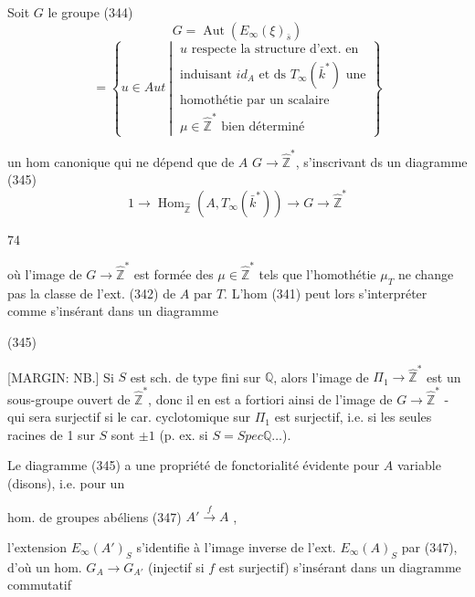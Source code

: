 Soit $G$ le groupe
(344) $$G = \operatorname{Aut}(E_{\infty}(\xi)_{\bar{s}})$$
$$= \left\{ u \in Aut \ \left| \ \begin{array}{l} u \text{ respecte la structure d'ext. en} \\ \text{induisant } id_A \text{ et ds } T_{\infty}(\bar{k}^*) \text{ une} \\ \text{homothétie par un scalaire} \\ \mu \in \hat{\mathbb{Z}}^* \text{ bien déterminé} \end{array} \right. \right\}$$

un hom canonique
qui ne dépend que de $A$
$G \to \hat{\mathbb{Z}}^*$, s'inscrivant ds un
diagramme
(345) $$1 \to \operatorname{Hom}_{\hat{\mathbb{Z}}}(A, T_{\infty}(\bar{k}^*)) \to G \to \hat{\mathbb{Z}}^*$$

\newpage


74

où l'image de $G \to \hat{\mathbb{Z}}^*$ est formée des $\mu \in \hat{\mathbb{Z}}^*$ tels que l'homothétie $\mu_T$ ne change pas la classe de l'ext. (342) de $A$ par $T$. L'hom (341) peut lors s'interpréter comme s'insérant dans un diagramme

(345)

[MARGIN: NB.] Si $S$ est sch. de type fini sur $\mathbb{Q}$, alors l'image de $\Pi_1 \to \hat{\mathbb{Z}}^*$ est un sous-groupe ouvert de $\hat{\mathbb{Z}}^*$, donc il en est a fortiori ainsi de l'image de $G \to \hat{\mathbb{Z}}^*$ - qui sera surjectif si le car. cyclotomique sur $\Pi_1$ est surjectif, i.e. si les seules racines de 1 sur $S$ sont $\pm 1$ (p. ex. si $S = Spec \mathbb{Q} \dots$).

Le diagramme (345) a
une propriété de fonctorialité évidente
pour $A$ variable (disons), i.e. pour un

\newpage


hom. de groupes abéliens
(347) $A' \xrightarrow{f} A$ ,

l'extension $E_{\infty}(A')_S$ s'identifie
à l'image inverse de l'ext. $E_{\infty}(A)_S$
par (347), d'où un hom.
$G_A \to G_{A'}$ (injectif si $f$ est surjectif)
s'insérant dans un diagramme
commutatif

